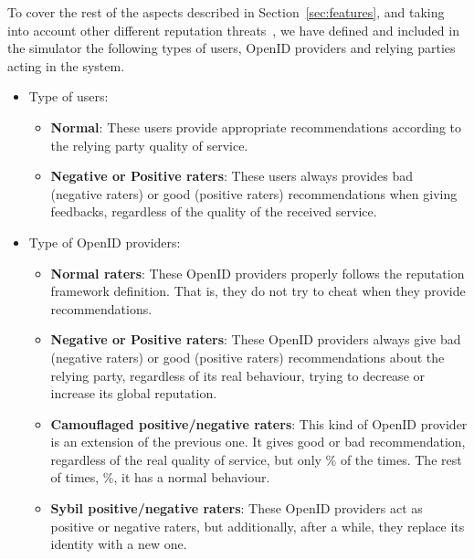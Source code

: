 \documentclass{llncs}
\begin{document}
To cover the rest of the aspects described in Section~\ref{sec:features}, and taking into account other different reputation threats~\cite{trt:2009:gomez-marmol:cose}, we have defined and included in the simulator the following types of users, OpenID providers and relying parties acting in the system.

\begin{itemize}

\item Type of users:
\begin{itemize}
\item \textbf{Normal}: These users provide appropriate
recommendations according to the relying party quality of service.

\item \textbf{Negative or Positive raters}: These users always provides bad (negative raters) or good (positive raters) recommendations when giving feedbacks, regardless of the quality of the received service.



\end{itemize}

\item Type of OpenID providers:
\begin{itemize}
\item \textbf{Normal raters}: These OpenID providers properly follows the reputation framework definition. That is, they do not try to cheat when they provide recommendations.

\item \textbf{Negative or Positive raters}: These OpenID providers
always give bad (negative raters) or good (positive raters) recommendations about the relying party, regardless of its real behaviour, trying to decrease or increase its global reputation.



\item \textbf{Camouflaged positive/negative raters}: This kind of OpenID
provider is an extension of the previous one. It gives good or bad
recommendation, regardless of the real quality of service, but only
\% of the times. The rest of times, \%, it has a
normal behaviour.

\item \textbf{Sybil positive/negative raters}: These OpenID
providers act as positive or negative raters, but additionally, after a while, they replace its identity with a new one. 
\end{itemize}


\end{itemize}
\end{document}
